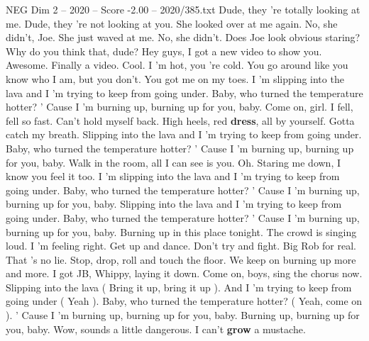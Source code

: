 \begin{textsample}{NEG Dim 2 – 2020 – Score -2.00 – 2020/385.txt}  \label{ex:f2_neg_028}
Dude, they 're totally looking at me.
Dude, they 're not looking at you.
She looked over at me again.
No, she didn't, Joe.
She just waved at me.
No, she didn't.
Does Joe look obvious staring?
Why do you think that, dude?
Hey guys, I got a new video to show you.
Awesome.
Finally a video.
Cool.
I 'm hot, you 're cold.
You go around like you know who I am, but you don't.
You got me on my toes.
I 'm slipping into the lava and I 'm trying to keep from going under.
Baby, who turned the temperature hotter? ' Cause I 'm burning up, burning up for you, baby.
Come on, girl.
I fell, fell so fast.
Can't hold myself back.
High heels, red \textbf{dress}, all by yourself.
Gotta catch my breath.
Slipping into the lava and I 'm trying to keep from going under.
Baby, who turned the temperature hotter? ' Cause I 'm burning up, burning up for you, baby.
Walk in the room, all I can see is you.
Oh.
Staring me down, I know you feel it too.
I 'm slipping into the lava and I 'm trying to keep from going under.
Baby, who turned the temperature hotter? ' Cause I 'm burning up, burning up for you, baby.
Slipping into the lava and I 'm trying to keep from going under.
Baby, who turned the temperature hotter? ' Cause I 'm burning up, burning up for you, baby.
Burning up in this place tonight.
The crowd is singing loud.
I 'm feeling right.
Get up and dance.
Don't try and fight.
Big Rob for real.
That 's no lie.
Stop, drop, roll and touch the floor.
We keep on burning up more and more.
I got JB, Whippy, laying it down.
Come on, boys, sing the chorus now.
Slipping into the lava ( Bring it up, bring it up ).
And I 'm trying to keep from going under ( Yeah ).
Baby, who turned the temperature hotter? ( Yeah, come on ). ' Cause I 'm burning up, burning up for you, baby.
Burning up, burning up for you, baby.
Wow, sounds a little dangerous.
I can't \textbf{grow} a mustache.

\end{textsample}
